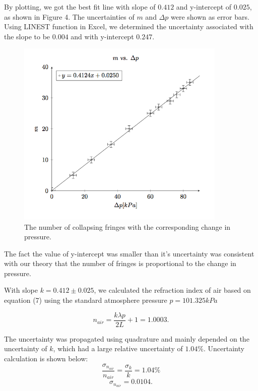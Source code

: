 \documentclass[12pt]{article}
\begin{document}
By plotting, we got the best fit line with slope of $0.412$ and y-intercept of $0.025$, as shown in Figure 4. The uncertainties of $m$ and $\Delta{p}$ were shown as error bars. Using LINEST function in Excel, we determined the uncertainty associated with the slope to be $0.004$ and with y-intercept $0.247$. 

\begin{figure}[!hbt]
	\begin{center}
		\includegraphics[width=10cm]{mp}
		\caption{The number of collapsing fringes with the corresponding change in pressure.}
	\end{center}
\end{figure}

The fact the value of y-intercept was smaller than it's uncertainty was consistent with our theory that the number of fringes is proportional to the change in pressure. 

With slope $k=0.412\pm0.025$, we calculated the refraction index of air based on equation (7) using the standard atmosphere pressure $p=101.325\si{kPa}$

\begin{equation}
n_{air}=\dfrac{k\lambda{p}}{2L}+1=1.0003.
\nonumber
\end{equation}

The uncertainty was propagated using quadrature and mainly depended on the uncertainty of $k$, which had a large relative uncertainty of $1.04\%$. 
Uncertainty calculation is shown below:
\begin{equation}
	\dfrac{\sigma_{n_{air}}}{n_{air}}=\dfrac{\sigma_{k}}{k}=1.04\%
	\nonumber
\end{equation}
\begin{equation}
		\sigma_{n_{air}}=0.0104.
		\nonumber
\end{equation}
\end{document}
